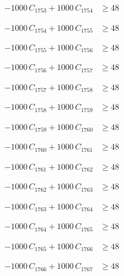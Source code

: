 \documentclass[a4paper,11pt]{article}
\begin{document}
\begin{align}
-1000\,C_{1753} + 1000\,C_{1754} &\geq 48 \nonumber
\end{align}

\begin{align}
-1000\,C_{1754} + 1000\,C_{1755} &\geq 48 \nonumber
\end{align}

\begin{align}
-1000\,C_{1755} + 1000\,C_{1756} &\geq 48 \nonumber
\end{align}

\begin{align}
-1000\,C_{1756} + 1000\,C_{1757} &\geq 48 \nonumber
\end{align}

\begin{align}
-1000\,C_{1757} + 1000\,C_{1758} &\geq 48 \nonumber
\end{align}

\begin{align}
-1000\,C_{1758} + 1000\,C_{1759} &\geq 48 \nonumber
\end{align}

\begin{align}
-1000\,C_{1759} + 1000\,C_{1760} &\geq 48 \nonumber
\end{align}

\begin{align}
-1000\,C_{1760} + 1000\,C_{1761} &\geq 48 \nonumber
\end{align}

\begin{align}
-1000\,C_{1761} + 1000\,C_{1762} &\geq 48 \nonumber
\end{align}

\begin{align}
-1000\,C_{1762} + 1000\,C_{1763} &\geq 48 \nonumber
\end{align}

\begin{align}
-1000\,C_{1763} + 1000\,C_{1764} &\geq 48 \nonumber
\end{align}

\begin{align}
-1000\,C_{1764} + 1000\,C_{1765} &\geq 48 \nonumber
\end{align}

\begin{align}
-1000\,C_{1765} + 1000\,C_{1766} &\geq 48 \nonumber
\end{align}

\begin{align}
-1000\,C_{1766} + 1000\,C_{1767} &\geq 48 \nonumber
\end{align}
\end{document}
